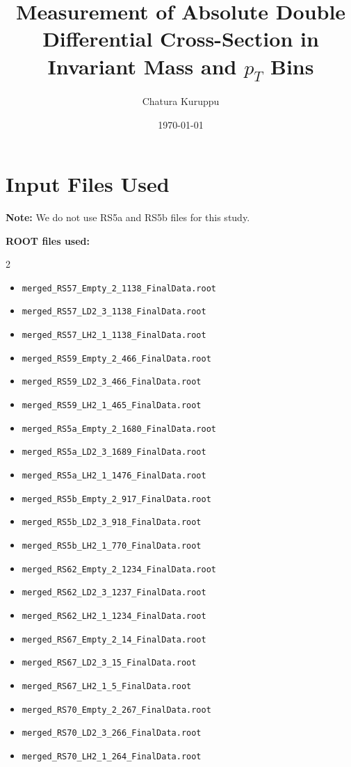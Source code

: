 \documentclass[12pt]{article}
\title{Measurement of Absolute Double Differential Cross-Section in Invariant Mass and $p_T$ Bins}
\author{Chatura Kuruppu}
\date{\today}
\begin{document}
\maketitle

\section{Input Files Used}

\textbf{Note:} We do not use RS5a and RS5b files for this study.

\vspace{0.2cm}
\textbf{ROOT files used:}
\begin{multicols}{2}
\begin{itemize}
    \tiny
    \item \texttt{merged\_RS57\_Empty\_2\_1138\_FinalData.root}
    \item \texttt{merged\_RS57\_LD2\_3\_1138\_FinalData.root}
    \item \texttt{merged\_RS57\_LH2\_1\_1138\_FinalData.root}
    \item \texttt{merged\_RS59\_Empty\_2\_466\_FinalData.root}
    \item \texttt{merged\_RS59\_LD2\_3\_466\_FinalData.root}
    \item \texttt{merged\_RS59\_LH2\_1\_465\_FinalData.root}
    \item \texttt{merged\_RS5a\_Empty\_2\_1680\_FinalData.root}
    \item \texttt{merged\_RS5a\_LD2\_3\_1689\_FinalData.root}
    \item \texttt{merged\_RS5a\_LH2\_1\_1476\_FinalData.root}
    \item \texttt{merged\_RS5b\_Empty\_2\_917\_FinalData.root}
    \item \texttt{merged\_RS5b\_LD2\_3\_918\_FinalData.root}
    \item \texttt{merged\_RS5b\_LH2\_1\_770\_FinalData.root}
    \item \texttt{merged\_RS62\_Empty\_2\_1234\_FinalData.root}
    \item \texttt{merged\_RS62\_LD2\_3\_1237\_FinalData.root}
    \item \texttt{merged\_RS62\_LH2\_1\_1234\_FinalData.root}
    \item \texttt{merged\_RS67\_Empty\_2\_14\_FinalData.root}
    \item \texttt{merged\_RS67\_LD2\_3\_15\_FinalData.root}
    \item \texttt{merged\_RS67\_LH2\_1\_5\_FinalData.root}
    \item \texttt{merged\_RS70\_Empty\_2\_267\_FinalData.root}
    \item \texttt{merged\_RS70\_LD2\_3\_266\_FinalData.root}
    \item \texttt{merged\_RS70\_LH2\_1\_264\_FinalData.root}
\end{itemize}
\end{multicols}
\end{document}

